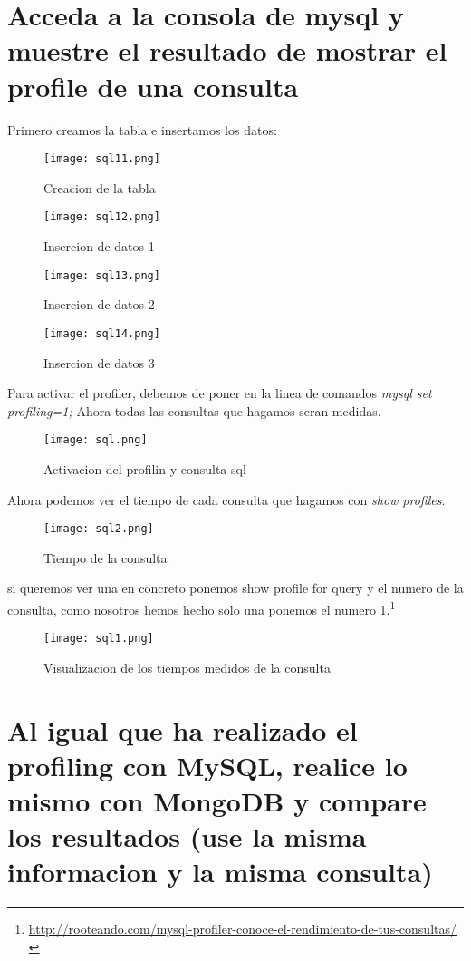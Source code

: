 \section{Acceda a la consola de mysql y muestre el resultado de mostrar el profile de una consulta}
Primero creamos la tabla e insertamos los datos:
\begin{figure}[H] 
\centering
\texttt{[image: sql11.png]}  
\label{figura24:}
\caption{Creacion de la tabla}
\end{figure}
\begin{figure}[H] 
\centering
\texttt{[image: sql12.png]}  
\label{figura24:}
\caption{Insercion de datos 1}
\end{figure}
\begin{figure}[H] 
\centering
\texttt{[image: sql13.png]}  
\label{figura24:}
\caption{Insercion de datos 2}
\end{figure}
\begin{figure}[H] 
\centering
\texttt{[image: sql14.png]}  
\label{figura24:}
\caption{Insercion de datos 3}
\end{figure}
Para activar el profiler, debemos de poner en la linea de comandos \textit{mysql set profiling=1;}
Ahora todas las consultas que hagamos seran medidas.

\begin{figure}[H] 
\centering
\texttt{[image: sql.png]}  
\label{figura24:}
\caption{Activacion del profilin y consulta sql}
\end{figure}

Ahora podemos ver el tiempo de cada consulta que hagamos con \textit{show profiles}. 
\begin{figure}[H] 
\centering
\texttt{[image: sql2.png]}  
\label{figura24:}
\caption{Tiempo de la consulta}
\end{figure}
si queremos ver una en concreto ponemos show profile for query y el numero de la consulta, como nosotros hemos hecho solo una ponemos el numero 1.\footnote{\url{http://rooteando.com/mysql-profiler-conoce-el-rendimiento-de-tus-consultas/}}

\begin{figure}[H] 
\centering
\texttt{[image: sql1.png]}  
\label{figura24:}
\caption{Visualizacion de los tiempos medidos de la consulta}
\end{figure}


\section{Al igual que ha realizado el profiling con MySQL, realice lo mismo con MongoDB y compare los resultados (use la misma informacion y la misma consulta)}

